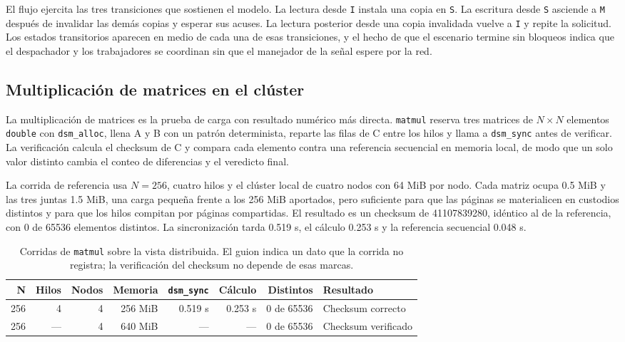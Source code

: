El flujo ejercita las tres transiciones que sostienen el modelo. La lectura desde \texttt{I} instala una copia en \texttt{S}. La escritura desde \texttt{S} asciende a \texttt{M} después de invalidar las demás copias y esperar sus acuses. La lectura posterior desde una copia invalidada vuelve a \texttt{I} y repite la solicitud. Los estados transitorios aparecen en medio de cada una de esas transiciones, y el hecho de que el escenario termine sin bloqueos indica que el despachador y los trabajadores se coordinan sin que el manejador de la señal espere por la red.

\subsection{Multiplicación de matrices en el clúster}

La multiplicación de matrices es la prueba de carga con resultado numérico más directa. \texttt{matmul} reserva tres matrices de $N \times N$ elementos \texttt{double} con \texttt{dsm\_alloc}, llena A y B con un patrón determinista, reparte las filas de C entre los hilos y llama a \texttt{dsm\_sync} antes de verificar. La verificación calcula el checksum de C y compara cada elemento contra una referencia secuencial en memoria local, de modo que un solo valor distinto cambia el conteo de diferencias y el veredicto final.

La corrida de referencia usa $N=256$, cuatro hilos y el clúster local de cuatro nodos con 64 MiB por nodo. Cada matriz ocupa 0.5 MiB y las tres juntas 1.5 MiB, una carga pequeña frente a los 256 MiB aportados, pero suficiente para que las páginas se materialicen en custodios distintos y para que los hilos compitan por páginas compartidas. El resultado es un checksum de 41107839280, idéntico al de la referencia, con 0 de 65536 elementos distintos. La sincronización tarda 0.519 s, el cálculo 0.253 s y la referencia secuencial 0.048 s.

\begin{table}[H]
\centering
\small
\begin{tabularx}{\linewidth}{@{}r r r r r r r Y@{}}
\toprule
\textbf{N} & \textbf{Hilos} & \textbf{Nodos} & \textbf{Memoria} & \textbf{\texttt{dsm\_sync}} & \textbf{Cálculo} & \textbf{Distintos} & \textbf{Resultado} \\
 & 4 & 4 & 256 MiB & 0.519 s & 0.253 s & 0 de 65536 & Checksum correcto \\
256 & --- & 4 & 640 MiB & --- & --- & 0 de 65536 & Checksum verificado \\
\bottomrule
\end{tabularx}
\caption{Corridas de \texttt{matmul} sobre la vista distribuida. El guion indica un dato que la corrida no registra; la verificación del checksum no depende de esas marcas.}
\label{tab:corridas}
\end{table}

